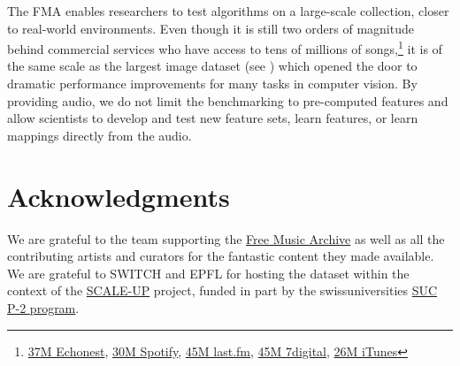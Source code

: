 \documentclass{article}
\begin{document}
The FMA enables researchers to test algorithms on a large-scale collection, closer to real-world environments. Even though it is still two orders of magnitude behind commercial services who have access to tens of millions of songs,\footnote{\href{http://the.echonest.com}{37M Echonest}, \href{https://en.wikipedia.org/wiki/Spotify}{30M Spotify}, \href{http://www.skilledtests.com/wiki/Last.fm_statistics}{45M last.fm}, \href{http://bupz.com/best-websites-to-buy-musics}{45M 7digital}, \href{https://www.apple.com/pr/library/2013/02/06iTunes-Store-Sets-New-Record-with-25-Billion-Songs-Sold.html}{26M iTunes}} it is of the same scale as the largest image dataset (see ) which opened the door to dramatic performance improvements for many tasks in computer vision.
By providing audio, we do not limit the benchmarking to pre-computed features and allow scientists to develop and test new feature sets, learn features, or learn mappings directly from the audio.



\section{Acknowledgments}


We are grateful to the team supporting the \href{https://freemusicarchive.org}{Free Music Archive} as well as all the contributing artists and curators for the fantastic content they made available.
We are grateful to SWITCH and EPFL for hosting the dataset within the context
of the \href{https://projects.switch.ch/scale-up}{SCALE-UP} project, funded in
part by the swissuniversities \href{http://www.swissuniversities.ch/isci}{SUC
P-2 program}.


\end{document}
